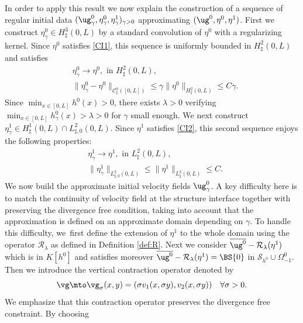 In order to apply this result we now explain the construction of a sequence of regular initial data $(\ug_\gamma^0,\eta_\gamma^0, \eta_\gamma^1)_{\gamma >0}$ approximating $(\ug^0, \eta^0, \eta^1)$. First we construct \hbox{$\eta^0_\gamma\in H^{3}_{\sharp}(0,L)$} by a standard convolution of $\eta^0$ with a regularizing kernel. Since $\eta^0$ satisfies \eqref{CI1}, this sequence is uniformly bounded in $H^2_\sharp(0,L)$ and satisfies
\begin{align*}
& \eta^0_\gamma\to \eta^0, \text{ in }H^2_\sharp(0,L),\\
& \| \eta^0_\gamma- \eta^0\|_{\mathcal{C}_\sharp^0([0, L])}\leq \gamma \|\eta^0\|_{H^2_\sharp(0, L)}\leq C\gamma.
\end{align*}
Since $\min_{x\in[0, L]}h^0(x)>0$, there exists $\lambda>0$ verifying $\min_{x\in[0, L]}h_\gamma^0(x)>\lambda >0$ for $\gamma$ small enough.
We next construct $\eta^1_\gamma \in H^{1}_{\sharp}(0,L)\cap L^2_{\sharp, 0}(0, L)$.
Since $\eta^1$ satisfies \eqref{CI2}, this second sequence enjoys the following properties:
\begin{align*}
& \eta^1_\gamma\to \eta^1, \text{ in }L^2_\sharp(0,L),\\
& \| \eta^1_\gamma \|_{{L}^2_{\sharp,0}(0, L)}\leq \|\eta^1\|_{L^2_\sharp(0, L)}\leq C.
\end{align*}
We now build the approximate initial velocity fields $\ug^0_{\gamma}$.
A key difficulty here is to match the continuity of velocity field at the structure interface together with preserving the divergence free condition, taking into account
that the approximation is defined on an approximate domain depending on $\gamma$.
To handle this difficulty, we~first define the extension of $\eta^1$ to the whole domain using the operator $\mathcal R_{\lambda}$
as defined in Definition \ref{def:R}. Next we consider $\overline{\ug^0}-\mathcal{R}_\lambda(\eta^1)$ which is in $K[h^0]$ and satisfies moreover $\overline{\ug^{0}}-\mathcal{R}_\lambda(\eta^1)= \BS{0}$ in $\mathcal{S}_{h^0}\cup \Omega_{-1}^0$. Then we introduce the vertical contraction operator denoted by
\[
\vg \mto \vg_\sigma(x, y)=(\sigma v_1(x, \sigma y), v_2(x, \sigma y)) \quad \forall \sigma >0.
\]
We emphasize that this contraction operator preserves the divergence free constraint. By choosing
